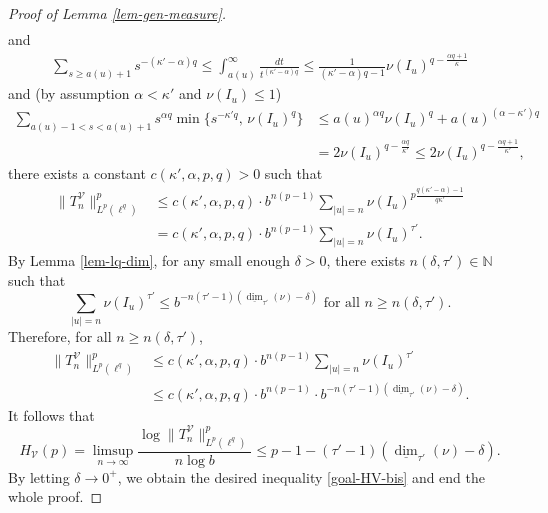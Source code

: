 \documentclass[12pt]{amsart}
\theoremstyle{definition}
\theoremstyle{remark}
\newcommand{\N}{\mathbb{N}}
\newcommand{\ldim}{\underline{\dim}}
\numberwithin{equation}{section}
\begin{document}
\begin{proof}[Proof of Lemma \ref{lem-gen-measure}]
\begin{align*}
\end{align*}
and 
\begin{align*}
\sum_{s\ge  a(u)+1}    s^{-(\kappa'-\alpha)q} \le \int_{a(u)}^\infty \frac{dt}{t^{(\kappa' - \alpha) q}} \le  \frac{1}{(\kappa' - \alpha) q -1}  \nu(I_u)^{q-\frac{\alpha q +1}{\kappa}}
\end{align*}
and  (by assumption $\alpha <\kappa'$ and $\nu(I_u)\le 1$)
\begin{align*}
\sum_{ a(u)-1<s<a(u)+1}  s^{\alpha q}    \min\big\{ s^{-\kappa' q},\, \nu(I_u)^q \big\}  &  \le   a(u)^{\alpha q} \nu(I_u)^q + a(u)^{(\alpha-\kappa')q}  
\\
&  =  2\nu(I_u)^{q- \frac{\alpha q}{\kappa'}} \le  2\nu(I_u)^{q- \frac{\alpha q +1}{\kappa'}},
\end{align*}
there exists a constant $c(\kappa', \alpha, p, q)>0$ such that 
\begin{align*}
\|T_n^{\mathcal{V}}\|_{L^p(\ell^q)}^p & \le  c(\kappa', \alpha, p, q)   \cdot  b^{n(p-1)}  \sum_{|u|=n}  \nu(I_u)^{p \frac{ q(\kappa'-\alpha) -1}{q \kappa'}}
\\ 
& =  c(\kappa', \alpha, p, q)   \cdot  b^{n(p-1)}  \sum_{|u|=n}  \nu(I_u)^{\tau'}. 
\end{align*}
By Lemma \ref{lem-lq-dim}, for any small enough $\delta>0$, there exists $n(\delta, \tau') \in \N$ such that 
\[
 \sum_{|u|=n}  \nu(I_u)^{\tau'}   \le  b^{-n (\tau'-1) (\ldim_{\tau'}(\nu) - \delta)}  \,\,  \text{for all $n\ge n(\delta, \tau')$.}
\]
Therefore, for all $n\ge n(\delta, \tau')$,
\begin{align*}
\|T_n^{\mathcal{V}}\|_{L^p(\ell^q)}^p & \le  c(\kappa', \alpha, p, q)   \cdot  b^{n(p-1)}  \sum_{|u|=n}  \nu(I_u)^{\tau'}
\\
&\le   c(\kappa', \alpha, p, q)   \cdot  b^{n(p-1)} \cdot  b^{-n (\tau'-1) (\ldim_{\tau'}(\nu) - \delta)}. 
\end{align*}
It follows that 
\[
H_\mathcal{V}(p) = \limsup_{n\to\infty}  \frac{ \log \|T_n^{\mathcal{V}}\|_{L^p(\ell^q)}^p }{n\log b}   \le     p-1 - (\tau'-1) ( \ldim_{\tau'}(\nu) - \delta). 
\]
By letting $\delta \to 0^{+}$, we obtain  the desired inequality \eqref{goal-HV-bis} and  end the  whole proof. 
\end{proof}
\end{document}
